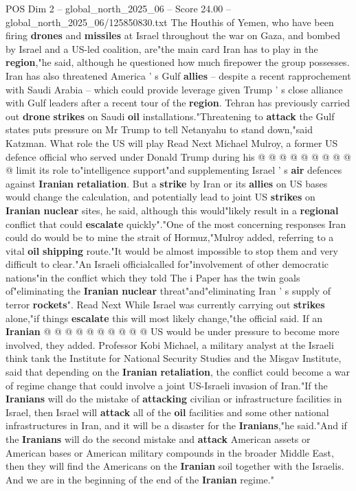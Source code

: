 \begin{textsample}{POS Dim 2 – global\_north\_2025\_06 – Score 24.00 – global\_north\_2025\_06/125850830.txt}
The Houthis of Yemen, who have been firing \textbf{drones} and \textbf{missiles} at Israel throughout the war on Gaza, and bombed by Israel and a US-led coalition, are"the main card Iran has to play in the \textbf{region},"he said, although he questioned how much firepower the group possesses.
Iran has also threatened America ' s Gulf \textbf{allies} -- despite a recent rapprochement with Saudi Arabia -- which could provide leverage given Trump ' s close alliance with Gulf leaders after a recent tour of the \textbf{region}.
Tehran has previously carried out \textbf{drone} \textbf{strikes} on Saudi \textbf{oil} installations."Threatening to \textbf{attack} the Gulf states puts pressure on Mr Trump to tell Netanyahu to stand down,"said Katzman.
What role the US will play Read Next Michael Mulroy, a former US defence official who served under Donald Trump during his @ @ @ @ @ @ @ @ @ @ limit its role to"intelligence support"and supplementing Israel ' s \textbf{air} defences against \textbf{Iranian} \textbf{retaliation}.
But a \textbf{strike} by Iran or its \textbf{allies} on US bases would change the calculation, and potentially lead to joint US \textbf{strikes} on \textbf{Iranian} \textbf{nuclear} sites, he said, although this would"likely result in a \textbf{regional} conflict that could \textbf{escalate} quickly"."One of the most concerning responses Iran could do would be to mine the strait of Hormuz,"Mulroy added, referring to a vital \textbf{oil} \textbf{shipping} route."It would be almost impossible to stop them and very difficult to clear."An Israeli officialcalled for"involvement of other democratic nations"in the conflict which they told The i Paper has the twin goals of"eliminating the \textbf{Iranian} \textbf{nuclear} threat"and"eliminating Iran ' s supply of terror \textbf{rockets}".
Read Next While Israel was currently carrying out \textbf{strikes} alone,"if things \textbf{escalate} this will most likely change,"the official said.
If an \textbf{Iranian} @ @ @ @ @ @ @ @ @ @ US would be under pressure to become more involved, they added.
Professor Kobi Michael, a military analyst at the Israeli think tank the Institute for National Security Studies and the Misgav Institute, said that depending on the \textbf{Iranian} \textbf{retaliation}, the conflict could become a war of regime change that could involve a joint US-Israeli invasion of Iran."If the \textbf{Iranians} will do the mistake of \textbf{attacking} civilian or infrastructure facilities in Israel, then Israel will \textbf{attack} all of the \textbf{oil} facilities and some other national infrastructures in Iran, and it will be a disaster for the \textbf{Iranians},"he said."And if the \textbf{Iranians} will do the second mistake and \textbf{attack} American assets or American bases or American military compounds in the broader Middle East, then they will find the Americans on the \textbf{Iranian} soil together with the Israelis.
And we are in the beginning of the end of the \textbf{Iranian} regime."

\end{textsample}
